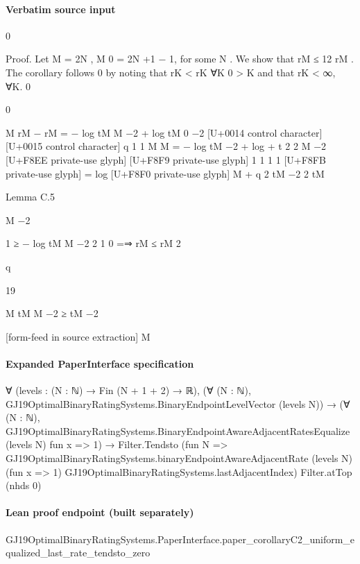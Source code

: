\documentclass[10pt]{article}
\begin{document}
\paragraph{Verbatim source input}
\begin{ReviewVerbatim}
0

Proof. Let M = 2N , M 0 = 2N +1 − 1, for some N . We show that rM ≤ 12 rM . The corollary follows
0
by noting that rK < rK ∀K 0 > K and that rK < ∞, ∀K.
0

0

M
rM − rM = − log tM
M −2 + log tM 0 −2
[U+0014 control character]
[U+0015 control character]
q
1 1 M
M
= − log tM −2 + log
+
t
2 2 M −2
[U+F8EE private-use glyph]
[U+F8F9 private-use glyph]
1 1
1
1 [U+F8FB private-use glyph]
= log [U+F8F0 private-use glyph] M + q
2 tM −2 2 tM

Lemma C.5

M −2

1
≥ − log tM
M −2
2
1
0
=⇒ rM ≤ rM
2

q

19

M
tM
M −2 ≥ tM −2


[form-feed in source extraction]
M
\end{ReviewVerbatim}


\paragraph{Expanded PaperInterface specification}
\begin{ReviewVerbatim}
∀ (levels : (N : ℕ) → Fin (N + 1 + 2) → ℝ),
  (∀ (N : ℕ), GJ19OptimalBinaryRatingSystems.BinaryEndpointLevelVector (levels N)) →
    (∀ (N : ℕ), GJ19OptimalBinaryRatingSystems.BinaryEndpointAwareAdjacentRatesEqualize (levels N) fun x => 1) →
      Filter.Tendsto
        (fun N =>
          GJ19OptimalBinaryRatingSystems.binaryEndpointAwareAdjacentRate (levels N) (fun x => 1)
            GJ19OptimalBinaryRatingSystems.lastAdjacentIndex)
        Filter.atTop (nhds 0)
\end{ReviewVerbatim}

\paragraph{Lean proof endpoint (built separately)}\begin{ReviewVerbatim}
GJ19OptimalBinaryRatingSystems.PaperInterface.paper_corollaryC2_uniform_equalized_last_rate_tendsto_zero
\end{ReviewVerbatim}
\end{document}
